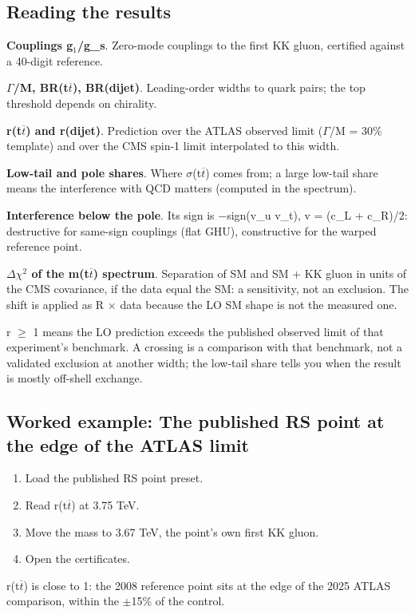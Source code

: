 \documentclass[11pt,a4paper]{article}
\begin{document}
\subsection*{Reading the results}
\textbf{Couplings g\ensuremath{{}_{1}}/g\_s}. Zero-mode couplings to the first KK gluon, certified against a 40-digit reference.

\textbf{\ensuremath{\Gamma}/M, BR(t\ensuremath{\overline{t}}), BR(dijet)}. Leading-order widths to quark pairs; the top threshold depends on chirality.

\textbf{r(t\ensuremath{\overline{t}}) and r(dijet)}. Prediction over the ATLAS observed limit (\ensuremath{\Gamma}/M = 30\% template) and over the CMS spin-1 limit interpolated to this width.

\textbf{Low-tail and pole shares}. Where \ensuremath{\sigma}(t\ensuremath{\overline{t}}) comes from; a large low-tail share means the interference with QCD matters (computed in the spectrum).

\textbf{Interference below the pole}. Its sign is \ensuremath{-}sign(v\_u v\_t), v = (c\_L + c\_R)/2: destructive for same-sign couplings (flat GHU), constructive for the warped reference point.

\textbf{\ensuremath{\Delta}\ensuremath{\chi}\ensuremath{{}^{2}} of the m(t\ensuremath{\overline{t}}) spectrum}. Separation of SM and SM + KK gluon in units of the CMS covariance, if the data equal the SM: a sensitivity, not an exclusion. The shift is applied as R \ensuremath{\times} data because the LO SM shape is not the measured one.

r \ensuremath{\geq} 1 means the LO prediction exceeds the published observed limit of that experiment's benchmark. A crossing is a comparison with that benchmark, not a validated exclusion at another width; the low-tail share tells you when the result is mostly off-shell exchange.
\subsection*{Worked example: The published RS point at the edge of the ATLAS limit}
\begin{enumerate}
\item Load the published RS point preset.
\item Read r(t\ensuremath{\overline{t}}) at 3.75 TeV.
\item Move the mass to 3.67 TeV, the point's own first KK gluon.
\item Open the certificates.
\end{enumerate}
r(t\ensuremath{\overline{t}}) is close to 1: the 2008 reference point sits at the edge of the 2025 ATLAS comparison, within the \ensuremath{\pm}15\% of the control.
\end{document}
